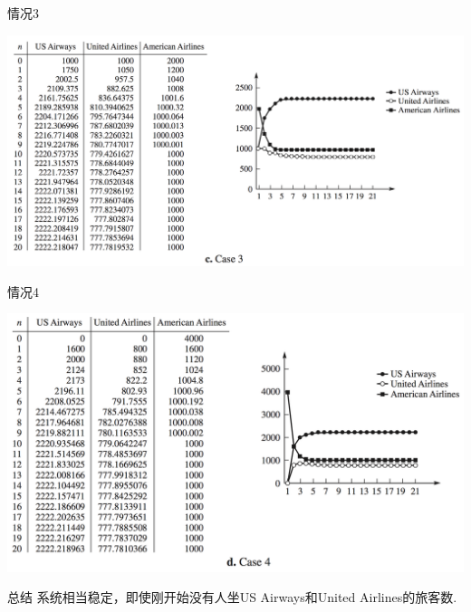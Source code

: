 \documentclass[UTF8]{ctexbeamer}
\begin{document}
\begin{frame}{情况3}
  \begin{center}
    \includegraphics[width=.9\textwidth{}]{party-3.png}
  \end{center}  
\end{frame}

\begin{frame}{情况4}
  \begin{center}
    \includegraphics[width=.9\textwidth{}]{party-4.png}
  \end{center}  
\end{frame}

\begin{frame}{总结}
系统相当稳定，即使刚开始没有人坐US Airways和United Airlines的旅客数.
  
\end{frame}
\end{document}

